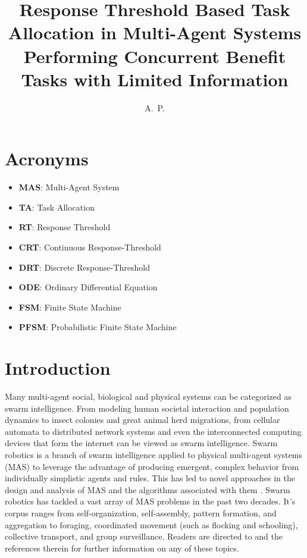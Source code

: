 \documentclass[defaultstyle,12pt]{thesis}
\title{Response Threshold Based Task Allocation in Multi-Agent Systems Performing Concurrent Benefit Tasks with Limited Information}
\author{A.~P.}{Kanakia}
\begin{document}
\chapter*{Acronyms}
\begin{itemize}
	\item \textbf{MAS}:  Multi-Agent System
	\item \textbf{TA}:   Task Allocation
	\item \textbf{RT}:   Response Threshold
	\item \textbf{CRT}:  Continuous Response-Threshold
	\item \textbf{DRT}:  Discrete Response-Threshold
	\item \textbf{ODE}:  Ordinary Differential Equation
	\item \textbf{FSM}:  Finite State Machine
	\item \textbf{PFSM}: Probabilistic Finite State Machine
\end{itemize}

\chapter{Introduction}
Many multi-agent social, biological and physical systems can be categorized as swarm intelligence. From modeling human societal interaction and population dynamics to insect colonies and great animal herd migrations, from cellular automata to distributed network systems and even the interconnected computing devices that form the internet can be viewed as swarm intelligence. Swarm robotics \cite{Sahin2005} is a branch of swarm intelligence applied to physical multi-agent systems (MAS) to leverage the advantage of producing emergent, complex behavior from individually simplistic agents and rules. This has led to novel approaches in the design and analysis of MAS and the algorithms associated with them \cite{Brambilla2013}. Swarm robotics has tackled a vast array of MAS problems in the past two decades. It's corpus ranges from self-organization, self-assembly, pattern formation, and aggregation to foraging, coordinated movement (such as flocking and schooling), collective transport, and group surveillance. Readers are directed to \cite{Bayindir2007} and the references therein for further information on any of these topics. 
\end{document}
